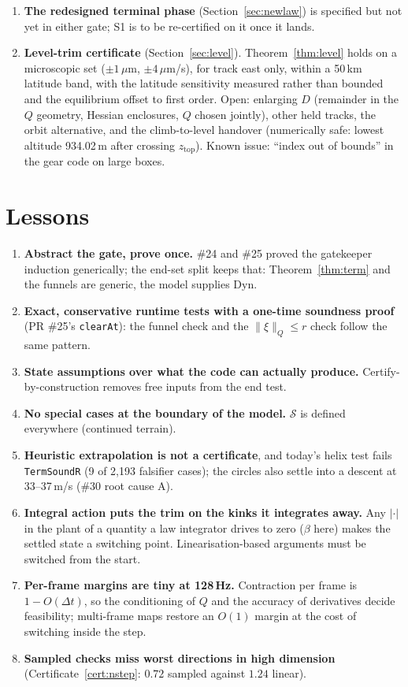 \documentclass[11pt]{article}
\newcommand{\Solid}{\mathcal{S}}
\newcommand{\Dyn}{\ensuremath{\mathrm{Dyn}}}
\newcommand{\zTop}{z_{\mathrm{top}}}
\begin{document}
\begin{enumerate}
\item[G10] \textbf{The redesigned terminal phase} (Section~\ref{sec:newlaw}) is specified but not yet in either gate; S1 is to be re-certified on it once it lands.
\item[G11] \textbf{Level-trim certificate} (Section~\ref{sec:level}). Theorem~\ref{thm:level} holds on a microscopic set ($\pm 1\,\mu$m, $\pm 4\,\mu$m/s), for track east only, within a 50\,km latitude band, with the latitude sensitivity measured rather than bounded and the equilibrium offset to first order. Open: enlarging $D$ (remainder in the $Q$ geometry, Hessian enclosures, $Q$ chosen jointly), other held tracks, the orbit alternative, and the climb-to-level handover (numerically safe: lowest altitude 934.02\,m after crossing $\zTop$). Known issue: ``index out of bounds'' in the gear code on large boxes.
\end{enumerate}

\section{Lessons}

\begin{enumerate}
\item \textbf{Abstract the gate, prove once.} \#24 and \#25 proved the gatekeeper induction generically; the end-set split keeps that: Theorem~\ref{thm:term} and the funnels are generic, the model supplies $\Dyn$.
\item \textbf{Exact, conservative runtime tests with a one-time soundness proof} (PR \#25's \texttt{clearAt}): the funnel check and the $\|\xi\|_Q \le r$ check follow the same pattern.
\item \textbf{State assumptions over what the code can actually produce.} Certify-by-construction removes free inputs from the end test.
\item \textbf{No special cases at the boundary of the model.} $\Solid$ is defined everywhere (continued terrain).
\item \textbf{Heuristic extrapolation is not a certificate}, and today's helix test fails \texttt{TermSoundR} (9 of 2{,}193 falsifier cases); the circles also settle into a descent at 33--37\,m/s (\#30 root cause A).
\item \textbf{Integral action puts the trim on the kinks it integrates away.} Any $|\cdot|$ in the plant of a quantity a law integrator drives to zero ($\beta$ here) makes the settled state a switching point. Linearisation-based arguments must be switched from the start.
\item \textbf{Per-frame margins are tiny at 128\,Hz.} Contraction per frame is $1 - O(\Delta t)$, so the conditioning of $Q$ and the accuracy of derivatives decide feasibility; multi-frame maps restore an $O(1)$ margin at the cost of switching inside the step.
\item \textbf{Sampled checks miss worst directions in high dimension} (Certificate~\ref{cert:nstep}: $0.72$ sampled against $1.24$ linear).
\end{enumerate}
\end{document}

